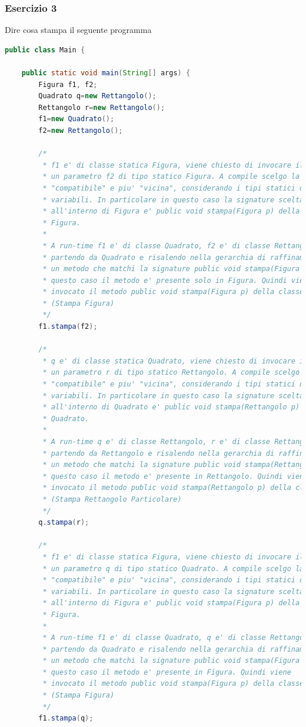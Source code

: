 \documentclass{article}
\begin{document}
\subsubsection{Esercizio 3}
Dire cosa stampa il seguente programma 
\begin{lstlisting}[language=Java,escapechar=|]
public class Main {

	public static void main(String[] args) {
		Figura f1, f2;
		Quadrato q=new Rettangolo();
		Rettangolo r=new Rettangolo();
		f1=new Quadrato();
		f2=new Rettangolo();
		
		/*
		 * f1 e' di classe statica Figura, viene chiesto di invocare il metodo stampa su
		 * un parametro f2 di tipo statico Figura. A compile scelgo la signature
		 * "compatibile" e piu' "vicina", considerando i tipi statici delle
		 * variabili. In particolare in questo caso la signature scelta
		 * all'interno di Figura e' public void stampa(Figura p) della classe
		 * Figura.
		 * 
		 * A run-time f1 e' di classe Quadrato, f2 e' di classe Rettangolo. Per questo
		 * partendo da Quadrato e risalendo nella gerarchia di raffinamento cerco
		 * un metodo che matchi la signature public void stampa(Figura p). In
		 * questo caso il metodo e' presente solo in Figura. Quindi viene
		 * invocato il metodo public void stampa(Figura p) della classe Figura
		 * (Stampa Figura)
		 */
		f1.stampa(f2);
		
		/*
		 * q e' di classe statica Quadrato, viene chiesto di invocare il metodo stampa su
		 * un parametro r di tipo statico Rettangolo. A compile scelgo la signature
		 * "compatibile" e piu' "vicina", considerando i tipi statici delle
		 * variabili. In particolare in questo caso la signature scelta
		 * all'interno di Quadrato e' public void stampa(Rettangolo p) della classe
		 * Quadrato.
		 * 
		 * A run-time q e' di classe Rettangolo, r e' di classe Rettangolo. Per questo
		 * partendo da Rettangolo e risalendo nella gerarchia di raffinamento cerco
		 * un metodo che matchi la signature public void stampa(Rettangolo p). In
		 * questo caso il metodo e' presente in Rettangolo. Quindi viene
		 * invocato il metodo public void stampa(Rettangolo p) della classe Rettangolo
		 * (Stampa Rettangolo Particolare)
		 */
		q.stampa(r);
		
		/*
		 * f1 e' di classe statica Figura, viene chiesto di invocare il metodo stampa su
		 * un parametro q di tipo statico Quadrato. A compile scelgo la signature
		 * "compatibile" e piu' "vicina", considerando i tipi statici delle
		 * variabili. In particolare in questo caso la signature scelta
		 * all'interno di Figura e' public void stampa(Figura p) della classe
		 * Figura.
		 * 
		 * A run-time f1 e' di classe Quadrato, q e' di classe Rettangolo. Per questo
		 * partendo da Quadrato e risalendo nella gerarchia di raffinamento cerco
		 * un metodo che matchi la signature public void stampa(Figura p). In
		 * questo caso il metodo e' presente in Figura. Quindi viene
		 * invocato il metodo public void stampa(Figura p) della classe Figura
		 * (Stampa Figura)
		 */
		f1.stampa(q);
		

\end{lstlisting}
\end{document}
